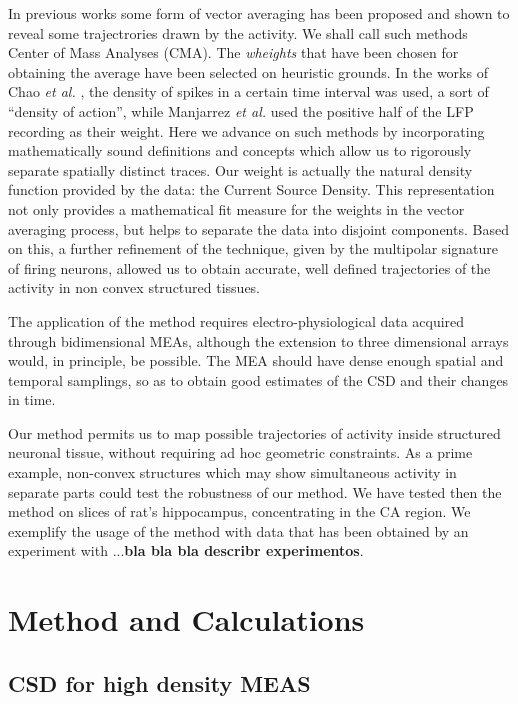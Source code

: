 \documentclass{article}
\begin{document}
In previous works some form of vector averaging has been proposed and shown to reveal some trajectrories drawn by the activity. We shall call such methods Center of Mass Analyses (CMA).  The \emph{wheights} that have been chosen for obtaining the average have been selected on heuristic grounds. In the works of Chao \emph{et al.} \cite{Chao05, Chao07}, the density of spikes in a certain time interval was used, a sort of ``density of action'', while Manjarrez \emph{et al.} \cite{Manjarrez07, Manjarrez09} used the positive half of the LFP recording as their weight. 
Here we advance on such methods by incorporating mathematically sound definitions and concepts which allow us to rigorously separate spatially distinct traces. Our weight is actually the natural density function provided by the data: the Current Source Density. This representation not only provides a mathematical fit measure for the weights in the vector averaging process, but helps to separate the data into disjoint components. Based on this, a further refinement of the technique, given by the multipolar signature of firing neurons, allowed us to obtain accurate, well defined trajectories of the activity in non convex structured tissues. 

The application of the method requires electro-physiological data acquired through bidimensional MEAs, although the extension to three dimensional arrays would, in principle, be possible. The MEA should have dense enough spatial and temporal samplings, so as to obtain good estimates of the CSD and their changes in time.

Our method permits us to map possible trajectories of activity inside structured neuronal tissue, without requiring ad hoc geometric constraints. As a prime example, non-convex structures which may show simultaneous activity in separate parts could test the robustness of our method. We have tested then the method on slices of rat's hippocampus, concentrating in the CA region. We exemplify the usage of the method with data that has been obtained by an experiment with ...\textbf{bla bla bla describr experimentos}.




\section{Method and Calculations}


\subsection{CSD for high density MEAS}
\end{document}
